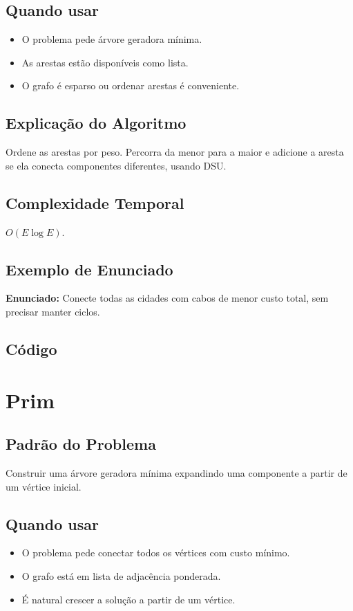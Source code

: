 \subsection{Quando usar}
\begin{itemize}[nosep]
  \item O problema pede árvore geradora mínima.
  \item As arestas estão disponíveis como lista.
  \item O grafo é esparso ou ordenar arestas é conveniente.
\end{itemize}

\subsection{Explicação do Algoritmo}
Ordene as arestas por peso. Percorra da menor para a maior e adicione a aresta se ela conecta componentes diferentes, usando DSU.

\subsection{Complexidade Temporal}
$O(E \log E)$.

\subsection{Exemplo de Enunciado}
\begin{exemplodiabox}
\textbf{Enunciado:} Conecte todas as cidades com cabos de menor custo total, sem precisar manter ciclos.
\end{exemplodiabox}

\subsection{Código}

\section{Prim}

\subsection{Padrão do Problema}
Construir uma árvore geradora mínima expandindo uma componente a partir de um vértice inicial.

\subsection{Quando usar}
\begin{itemize}[nosep]
  \item O problema pede conectar todos os vértices com custo mínimo.
  \item O grafo está em lista de adjacência ponderada.
  \item É natural crescer a solução a partir de um vértice.
\end{itemize}

